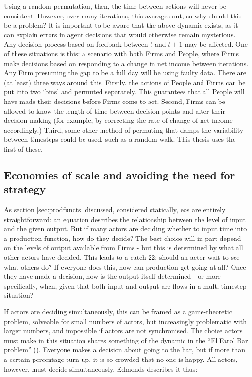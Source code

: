 {Using a random permutation, then, the time between actions will never be consistent. However, over many iterations, this averages out, so why should this be a problem? It is important to be aware that the above dynamic exists, as it can explain errors in agent decisions that would otherwise remain mysterious. Any decision process based on feedback between $t$ and $t+1$ may be affected. One of these situations is this: a scenario with both Firms and People, where Firms make decisions based on responding to a change in net income between iterations. Any Firm presuming the gap to be a full day will be using faulty data. There are (at least) three ways around this. Firstly, the actions of People and Firms can be put into two `bins' and permuted separately. This guarantees that all People will have made their decisions before Firms come to act. Second, Firms can be allowed to know the length of time between decision points and alter their decision-making (for example, by correcting the rate of change of net income accordingly.) Third, some other method of permuting that damps the variability between timesteps could be used, such as a random walk. This thesis uses the first of these. 

\subsection{Economies of scale and avoiding the need for strategy \label{sec:abmprod}}

As section \ref{sec:prodfuncts} discussed, considered statically, \gls{eos} are entirely straightforward: an equation describes the relationship between the level of input and the given output. But if many actors are deciding whether to input time into a production function, how do they decide? The best choice will in part depend on the levels of output available from Firms - but this is determined by what all other actors have decided. This leads to a catch-22: should an actor wait to see what others do? If everyone does this, how can production get going at all? Once they have made a decision, how is the output itself determined - or more specifically, when, given that both input and output are flows in a multi-timestep situation?

If actors are deciding simultaneously, this can be framed as a game-theoretic problem, solveable for small numbers of actors, but increasingly problematic with larger numbers, and impossible if actors are not synchronised. The choice actors must make in this situation shares something of the dynamic in the ``El Farol Bar problem'' (\citealt{ arthur_inductive_1994}). Everyone makes a decision about going to the bar, but if more than a certain percentage turn up, it is so crowded that no-one is happy. All actors, however, must decide simultaneously. Edmonds describes it thus:

}

